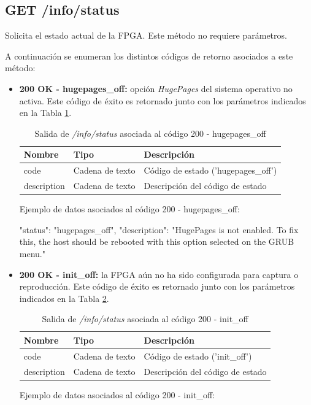 %
%
\subsection{GET /info/status}
Solicita el estado actual de la \gls{FPGA}. Este método no requiere parámetros.

A continuación se enumeran los distintos códigos de retorno asociados a este método:
\begin{itemize}

\item{\textbf{200 OK - hugepages\_off:} opción \textit{HugePages} del sistema operativo no activa. Este código de éxito es retornado junto con los parámetros indicados en la Tabla \ref{extra:api:infostatus:hugepagesoff}.
\begin{table}[H]
\centering
\begin{tabular}{|l|l|l|}
\hline
\rowcolor[HTML]{F5F5F5}
\textbf{Nombre}  & \textbf{Tipo}   & \textbf{Descripción}               \\ \hline
code             & Cadena de texto & Código de estado ('hugepages\_off') \\ \hline
description      & Cadena de texto & Descripción del código de estado   \\ \hline
\end{tabular}
\caption{Salida de \textit{/info/status} asociada al código 200 - hugepages\_off}
\label{extra:api:infostatus:hugepagesoff}
\end{table}
\begin{minipage}{\textwidth}
Ejemplo de datos asociados al código 200 - hugepages\_off:

\begin{code}[language=json]
{
  "status": "hugepages_off",
  "description": "HugePages is not enabled. To fix this, the host should be rebooted with this option selected on the GRUB menu."
}
\end{code}
\end{minipage}
}

\item{\textbf{200 OK - init\_off:} la \gls{FPGA} aún no ha sido configurada para captura o reproducción. Este código de éxito es retornado junto con los parámetros indicados en la Tabla \ref{extra:api:infostatus:initoff}.
\begin{table}[H]
\centering
\begin{tabular}{|l|l|l|}
\hline
\rowcolor[HTML]{F5F5F5}
\textbf{Nombre}  & \textbf{Tipo}   & \textbf{Descripción}               \\ \hline
code             & Cadena de texto & Código de estado ('init\_off')     \\ \hline
description      & Cadena de texto & Descripción del código de estado   \\ \hline
\end{tabular}
\caption{Salida de \textit{/info/status} asociada al código 200 - init\_off}
\label{extra:api:infostatus:initoff}
\end{table}
\begin{minipage}{\textwidth}
Ejemplo de datos asociados al código 200 - init\_off:


\end{minipage}}
\end{itemize}
